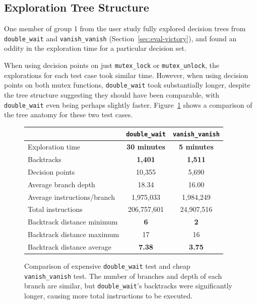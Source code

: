 \subsection{Exploration Tree Structure}
\label{sec:future-nadim}

One member of group 1 from the user study fully explored decision trees from \texttt{double\_wait} and \texttt{vanish\_vanish} (Section~\ref{sec:eval-victory}), and found an oddity in the exploration time for a particular decision set.

When using decision points on just \texttt{mutex\_lock} or \texttt{mutex\_unlock}, the explorations for each test case took similar time. However, when using decision points on both mutex functions, \texttt{double\_wait} took substantially longer, despite the tree structure suggesting they should have been comparable, with \texttt{double\_wait} even being perhaps slightly faster. Figure~\ref{fig:nadim-stats} shows a comparison of the tree anatomy for these two test cases.

\begin{figure}[h]
	\small
	\centering
	\begin{tabular}{|l||c|c|}
		\hline
		& \texttt{double\_wait} & \texttt{vanish\_vanish} \\
		\hline\hline
		Exploration time & {\bf 30 minutes} & {\bf 5 minutes} \\
		\hline
		Backtracks & {\bf 1,401} & {\bf 1,511} \\
		\hline
		Decision points & 10,355 & 5,690 \\
		\hline
		Average branch depth & 18.34 & 16.00 \\
		\hline
		Average instructions/branch& 1,975,033 & 1,984,249 \\
		\hline
		Total instructions & 206,757,601 & 24,907,516 \\
		\hline
		Backtrack distance minimum & {\bf 6} & {\bf 2} \\
		\hline
		Backtrack distance maximum & 17 & 16 \\
		\hline
		Backtrack distance average & {\bf 7.38}  & {\bf 3.75} \\
		\hline
	\end{tabular}
	\caption{Comparison of expensive \texttt{double\_wait} test and cheap \texttt{vanish\_vanish} test. The number of branches and depth of each branch are similar, but \texttt{double\_wait}'s backtracks were significantly longer, causing more total instructions to be executed.}
	\label{fig:nadim-stats}
\end{figure}

